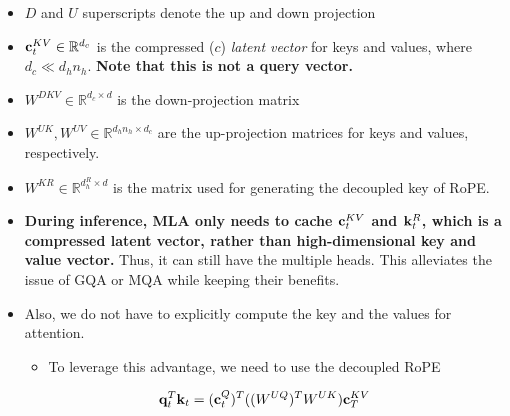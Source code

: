 \begin{itemize}
	\item $D$ and $U$ superscripts denote the up and down projection
	\item ${\mathbf{c}}_t^{KV}\in \mathbb{R}^{d_c}$ is the compressed (\ie $c$) \textit{latent vector} for keys and values, where $d_c\ll d_hn_h$. \textbf{Note that this is not a query vector.}
	\item $W^{DKV}\in \mathbb{R}^{d_c\times d}$ is the down-projection matrix
	\item $W^{UK},W^{UV}\in \mathbb{R}^{d_hn_h\times d_c}$ are the up-projection matrices for keys and values, respectively.
	\item $W^{KR}\in \mathbb{R}^{d_h^R\times d}$ is the matrix used for generating the decoupled key of RoPE. 
	\item \textbf{During inference, MLA only needs to cache ${\mathbf{c}}_t^{KV}$ and ${\mathbf{k}}_t^{R}$, which is a compressed latent vector, rather than high-dimensional key and value vector.} Thus, it can still have the multiple heads. This alleviates the issue of GQA or MQA while keeping their benefits. 
	\item Also, we do not have to explicitly compute the key and the values for attention.
		\begin{itemize}
			\item To leverage this advantage, we need to use the decoupled RoPE
		\end{itemize}
		\begin{align*}
			{\mathbf{q}}_t^T{\mathbf{k}}_t = ({\mathbf{c}}_t^Q)^T((W^{UQ})^TW^{UK}){\mathbf{c}}_T^{KV}
		\end{align*}
\end{itemize}

